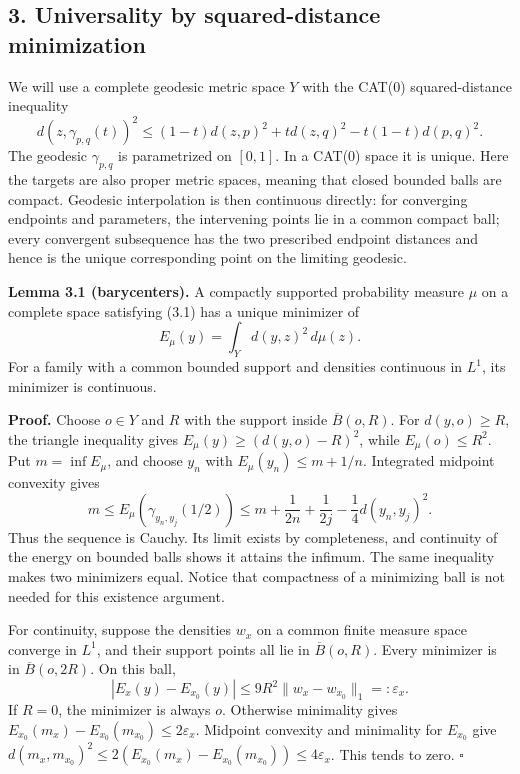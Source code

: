 \documentclass[
  11pt,
]{article}
\begin{document}
\subsection{3. Universality by squared-distance
minimization}\label{universality-by-squared-distance-minimization}

We will use a complete geodesic metric space \(Y\) with the CAT(0)
squared-distance inequality \[
 d(z,\gamma_{p,q}(t))^2
 \le(1-t)d(z,p)^2+t d(z,q)^2-t(1-t)d(p,q)^2.
 \tag{3.1}
\] The geodesic \(\gamma_{p,q}\) is parametrized on \([0,1]\). In a
CAT(0) space it is unique. Here the targets are also proper metric
spaces, meaning that closed bounded balls are compact. Geodesic
interpolation is then continuous directly: for converging endpoints and
parameters, the intervening points lie in a common compact ball; every
convergent subsequence has the two prescribed endpoint distances and
hence is the unique corresponding point on the limiting geodesic.

\textbf{Lemma 3.1 (barycenters).} A compactly supported probability
measure \(\mu\) on a complete space satisfying (3.1) has a unique
minimizer of \[
                           E_\mu(y)=\int_Y d(y,z)^2\,d\mu(z).
 \tag{3.2}
\] For a family with a common bounded support and densities continuous
in \(L^1\), its minimizer is continuous.

\textbf{Proof.} Choose \(o\in Y\) and \(R\) with the support inside
\(\overline B(o,R)\). For \(d(y,o)\ge R\), the triangle inequality gives
\(E_\mu(y)\ge(d(y,o)-R)^2\), while \(E_\mu(o)\le R^2\). Put
\(m=\inf E_\mu\), and choose \(y_n\) with \(E_\mu(y_n)\le m+1/n\).
Integrated midpoint convexity gives \[
 m\le E_\mu(\gamma_{y_n,y_j}(1/2))
 \le m+\frac1{2n}+\frac1{2j}-\frac14d(y_n,y_j)^2.
\] Thus the sequence is Cauchy. Its limit exists by completeness, and
continuity of the energy on bounded balls shows it attains the infimum.
The same inequality makes two minimizers equal. Notice that compactness
of a minimizing ball is not needed for this existence argument.

For continuity, suppose the densities \(w_x\) on a common finite measure
space converge in \(L^1\), and their support points all lie in
\(\overline B(o,R)\). Every minimizer is in \(\overline B(o,2R)\). On
this ball, \[
       |E_x(y)-E_{x_0}(y)|\le9R^2\|w_x-w_{x_0}\|_1=:\varepsilon_x.
 \tag{3.3}
\] If \(R=0\), the minimizer is always \(o\). Otherwise minimality gives
\(E_{x_0}(m_x)-E_{x_0}(m_{x_0})\le2\varepsilon_x\). Midpoint convexity
and minimality for \(E_{x_0}\) give
\(d(m_x,m_{x_0})^2\le2(E_{x_0}(m_x)-E_{x_0}(m_{x_0}))\le4\varepsilon_x\).
This tends to zero. \(\square\)
\end{document}
